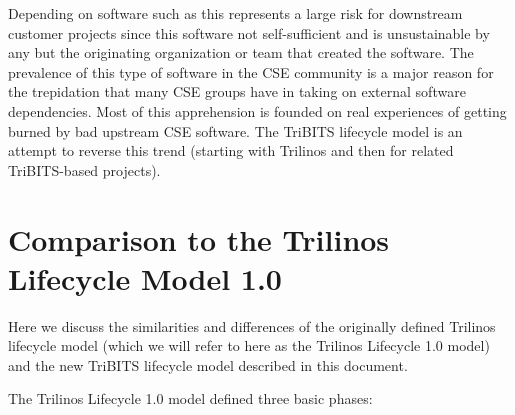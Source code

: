 \documentclass[11pt]{SANDreport}
\begin{document}
Depending on software such as this represents a large risk for
downstream customer projects since this software not self-sufficient
and is unsustainable by any but the originating organization or team that
created the software.  The prevalence of this type of software in the
CSE community is a major reason for the trepidation that many CSE
groups have in taking on external software dependencies.  Most of this
apprehension is founded on real experiences of getting burned by bad
upstream CSE software.  The TriBITS lifecycle model is an attempt to
reverse this trend (starting with Trilinos and then for related
TriBITS-based projects).


%
\section{Comparison to the Trilinos Lifecycle Model 1.0}
\label{sec:compare_with_lifecycle_1.0_model}
%

Here we discuss the similarities and differences of the originally
defined Trilinos lifecycle model {}\cite{TrilinosLifecycleModel2007}
(which we will refer to here as the Trilinos Lifecycle 1.0 model) and the
new TriBITS lifecycle model described in this document.

The Trilinos Lifecycle 1.0 model defined three basic phases:
\end{document}
